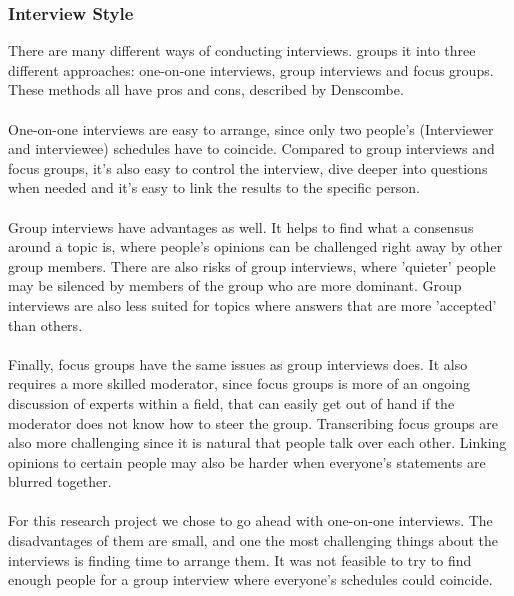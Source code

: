 \documentclass{cslthse-msc}
\begin{document}
    \subsubsection{Interview Style}
    There are many different ways of conducting interviews. \citet{denscombe} groups it into
    three different approaches: one-on-one interviews, group interviews and focus groups.
    These methods all have pros and cons, described by Denscombe.
    \\ \\
    One-on-one interviews are easy to arrange, since
    only two people's (Interviewer and interviewee) schedules have to coincide.
    Compared to group interviews and focus groups, it's also easy to control the interview,
    dive deeper into questions when needed and it's easy to link the results
    to the specific person.
    \\ \\
    Group interviews have advantages as well. It helps to find what a consensus around
    a topic is, where people's opinions can be challenged right away by other group members.
    There are also risks of group interviews, where 'quieter' people may be silenced by
    members of the group who are more dominant. Group interviews are also less suited
    for topics where answers that are more 'accepted' than others.
    \\ \\
    Finally, focus groups have the same issues as group interviews does. It also
    requires a more skilled moderator, since focus groups is more of an ongoing
    discussion of experts within a field, that can easily get out of hand if the
    moderator does not know how to steer the group.  Transcribing focus groups are also
    more challenging since it is natural that people talk over each other. Linking opinions
    to certain people may also be harder when everyone's statements are blurred together.
    \\ \\
    For this research project we chose to go ahead with one-on-one interviews.
    The disadvantages of them are small, and one the most challenging things
    about the interviews is finding time to arrange them. It was not feasible
    to try to find enough people for a group interview where everyone's schedules
    could coincide.
\end{document}
